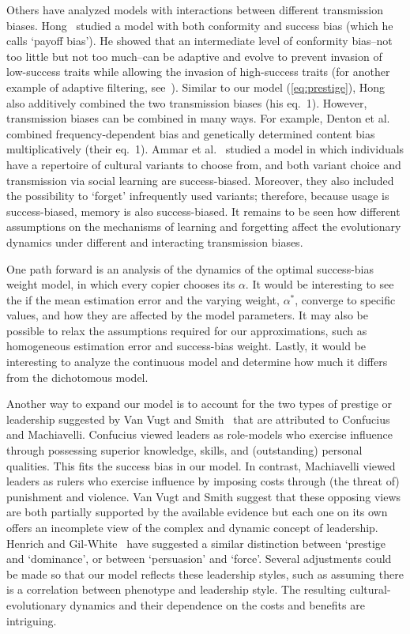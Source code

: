 \documentclass[12pt]{extarticle}
\begin{document}
Others have analyzed models with interactions between different transmission biases.
Hong~\citep{payoff} studied a model with both conformity and success bias (which he calls `payoff bias'). 
He showed that an intermediate level of conformity bias--not too little but not too much--can be adaptive and evolve to prevent invasion of low-success traits while allowing the invasion of high-success traits (for another example of adaptive filtering, see~\citep{adaptive_filtering}).
Similar to our model (\cref{eq:prestige}), Hong~\citep{payoff} also additively combined the two transmission biases (his eq.~1). However, transmission biases can be combined in many ways. 
For example, Denton et al.~\citep{Denton2022} combined frequency-dependent bias and genetically determined content bias multiplicatively (their eq.~1). 
Ammar et al.~\citep{Ammar2023} studied a model in which individuals have a repertoire of cultural variants to choose from, and both variant choice and transmission via social learning are success-biased. Moreover, they also included the possibility to `forget' infrequently used variants; therefore, because usage is success-biased, memory is also success-biased. It remains to be seen how different assumptions on the mechanisms of learning and forgetting affect the evolutionary dynamics under different and interacting transmission biases.

One path forward is an analysis of the dynamics of the optimal success-bias weight model, in which every copier chooses its $\alpha$. It would be interesting to see the if the mean estimation error and the varying weight, $\alpha^*$, converge to specific values, and how they are affected by the model parameters.
It may also be possible to relax the assumptions required for our approximations, such as homogeneous estimation error and success-bias weight.
Lastly, it would be interesting to analyze the continuous model and determine how much it differs from the dichotomous model. 

Another way to expand our model is to account for the two types of prestige or leadership suggested by Van Vugt and Smith~\citep{dual_leadership} that are attributed to Confucius and Machiavelli. Confucius viewed leaders as role-models who exercise influence through possessing superior knowledge, skills, and (outstanding) personal qualities. This fits the success bias in our model. 
In contrast, Machiavelli viewed leaders as rulers who exercise influence by imposing costs through (the threat of) punishment and violence.
Van Vugt and Smith suggest that these opposing views are both partially supported by the available evidence but each one on its own offers an incomplete view of the complex and dynamic concept of leadership. 
Henrich and Gil-White~\citep{prestige_evolution} have suggested a similar distinction between `prestige and `dominance', or between `persuasion' and `force'.
Several adjustments could be made so that our model reflects these leadership styles, such as assuming there is a correlation between phenotype and leadership style. The resulting cultural-evolutionary dynamics and their dependence on the costs and benefits are intriguing.
\end{document}
